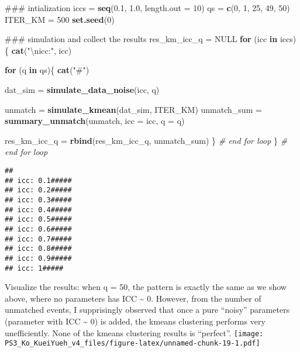 \documentclass[]{article}
\newenvironment{Shaded}{\begin{snugshade}}{\end{snugshade}}
\newcommand{\KeywordTok}[1]{\textcolor[rgb]{0.13,0.29,0.53}{\textbf{#1}}}
\newcommand{\DataTypeTok}[1]{\textcolor[rgb]{0.13,0.29,0.53}{#1}}
\newcommand{\DecValTok}[1]{\textcolor[rgb]{0.00,0.00,0.81}{#1}}
\newcommand{\FloatTok}[1]{\textcolor[rgb]{0.00,0.00,0.81}{#1}}
\newcommand{\CharTok}[1]{\textcolor[rgb]{0.31,0.60,0.02}{#1}}
\newcommand{\StringTok}[1]{\textcolor[rgb]{0.31,0.60,0.02}{#1}}
\newcommand{\CommentTok}[1]{\textcolor[rgb]{0.56,0.35,0.01}{\textit{#1}}}
\newcommand{\OtherTok}[1]{\textcolor[rgb]{0.56,0.35,0.01}{#1}}
\newcommand{\ControlFlowTok}[1]{\textcolor[rgb]{0.13,0.29,0.53}{\textbf{#1}}}
\newcommand{\NormalTok}[1]{#1}
\begin{document}
\begin{Shaded}
\begin{Highlighting}[]
\NormalTok{### intialization}
\NormalTok{iccs =}\StringTok{ }\KeywordTok{seq}\NormalTok{(}\FloatTok{0.1}\NormalTok{, }\FloatTok{1.0}\NormalTok{, }\DataTypeTok{length.out =} \DecValTok{10}\NormalTok{)}
\NormalTok{qs   =}\StringTok{ }\KeywordTok{c}\NormalTok{(}\DecValTok{0}\NormalTok{, }\DecValTok{1}\NormalTok{, }\DecValTok{25}\NormalTok{, }\DecValTok{49}\NormalTok{, }\DecValTok{50}\NormalTok{)}
\NormalTok{ITER_KM =}\StringTok{ }\DecValTok{500}
\KeywordTok{set.seed}\NormalTok{(}\DecValTok{0}\NormalTok{)}

\NormalTok{### simulation and collect the results}
\NormalTok{res_km_icc_q =}\StringTok{ }\OtherTok{NULL}
\ControlFlowTok{for}\NormalTok{ (icc }\ControlFlowTok{in}\NormalTok{ iccs)\{}
    \KeywordTok{cat}\NormalTok{(}\StringTok{"}\CharTok{\textbackslash{}n}\StringTok{icc:"}\NormalTok{, icc)}
    
    \ControlFlowTok{for}\NormalTok{ (q }\ControlFlowTok{in}\NormalTok{ qs)\{}
        \KeywordTok{cat}\NormalTok{(}\StringTok{"#"}\NormalTok{)}
        
\NormalTok{        dat_sim =}\StringTok{ }\KeywordTok{simulate_data_noise}\NormalTok{(icc, q)}
        
\NormalTok{        unmatch =}\StringTok{ }\KeywordTok{simulate_kmean}\NormalTok{(dat_sim, ITER_KM)}
\NormalTok{        unmatch_sum =}\StringTok{ }\KeywordTok{summary_unmatch}\NormalTok{(unmatch, }\DataTypeTok{icc =}\NormalTok{ icc, }\DataTypeTok{q =}\NormalTok{ q)}
        
\NormalTok{        res_km_icc_q =}\StringTok{ }\KeywordTok{rbind}\NormalTok{(res_km_icc_q, unmatch_sum)}
\NormalTok{    \} }\CommentTok{# end for loop}
\NormalTok{\} }\CommentTok{# end for loop}
\end{Highlighting}
\end{Shaded}

\begin{verbatim}
## 
## icc: 0.1#####
## icc: 0.2#####
## icc: 0.3#####
## icc: 0.4#####
## icc: 0.5#####
## icc: 0.6#####
## icc: 0.7#####
## icc: 0.8#####
## icc: 0.9#####
## icc: 1#####
\end{verbatim}

Visualize the results: when q = 50, the pattern is exactly the same as
we show above, where no parameters has ICC \textasciitilde{} 0. However,
from the number of unmatched events, I supprisingly observed that once a
pure ``noisy'' parameters (parameter with ICC \textasciitilde{} 0) is
added, the kmeans clustering performs very unefficiently. None of the
kmeans clustering results is ``perfect''.
\texttt{[image: PS3\_Ko\_KueiYueh\_v4\_files/figure-latex/unnamed-chunk-19-1.pdf]}
\end{document}
